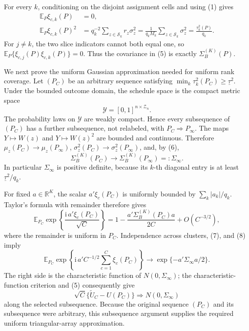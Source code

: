For every \(k\), conditioning on the disjoint assignment cells and using (1) gives
\[
\begin{aligned}
\mathbb E_P\xi_{c,k}(P)&=0,\\
\mathbb E_P\xi_{c,k}(P)^2
&=q_k^{-2}\sum_{z\in\mathcal S_k}r_z\sigma_z^2
=\frac1{q_kM_k}\sum_{z\in\mathcal S_k}\sigma_z^2
=\frac{\tau_k^2(P)}{q_k}. 
\end{aligned} \tag{6}
\]
For \(j\ne k\), the two slice indicators cannot both equal one, so
\(\mathbb E_P\{\xi_{c,j}(P)\xi_{c,k}(P)\}=0\).  Thus the covariance in (5) is exactly \(\Sigma_B^{(K)}(P)\).

We next prove the uniform Gaussian approximation needed for uniform rank coverage.  Let \((P_C)\) be an arbitrary sequence satisfying
\(\min_k\tau_k^2(P_C)\geq\underline\tau^2\).  Under the bounded outcome domain, the schedule space is the compact metric space
\[
\mathcal Y=[0,1]^{n\times\mathcal Z_n}.
\]
The probability laws on \(\mathcal Y\) are weakly compact.  Hence every subsequence of \((P_C)\) has a further subsequence, not relabeled, with \(P_C\Rightarrow P_\infty\).  The maps \(Y\mapsto W(z)\) and \(Y\mapsto W(z)^2\) are bounded and continuous.  Therefore \(\mu_z(P_C)\to\mu_z(P_\infty)\), \(\sigma_z^2(P_C)\to\sigma_z^2(P_\infty)\), and, by (6),
\[
\Sigma_B^{(K)}(P_C)\longrightarrow\Sigma_B^{(K)}(P_\infty)=:\Sigma_\infty. \tag{7}
\]
In particular \(\Sigma_\infty\) is positive definite, because its \(k\)-th diagonal entry is at least \(\underline\tau^2/q_k\).

For fixed \(a\in\mathbb R^K\), the scalar \(a'\xi_c(P_C)\) is uniformly bounded by
\(\sum_k|a_k|/q_k\).  Taylor's formula with remainder therefore gives
\[
\mathbb E_{P_C}\exp\!\left\{\frac{\mathrm i\,a'\xi_c(P_C)}{\sqrt C}\right\}
=1-\frac{a'\Sigma_B^{(K)}(P_C)a}{2C}+O(C^{-3/2}), \tag{8}
\]
where the remainder is uniform in \(P_C\).  Independence across clusters, (7), and (8) imply
\[
\mathbb E_{P_C}\exp\!\left\{\mathrm i\,a'C^{-1/2}\sum_{c=1}^C\xi_c(P_C)\right\}
\longrightarrow \exp\{-a'\Sigma_\infty a/2\}. \tag{9}
\]
The right side is the characteristic function of \(N(0,\Sigma_\infty)\); the characteristic-function criterion and (5) consequently give
\[
\sqrt C\{\widetilde U_C-U(P_C)\}\Rightarrow N(0,\Sigma_\infty) \tag{10}
\]
along the selected subsequence.  Because the original sequence \((P_C)\) and its subsequence were arbitrary, this subsequence argument supplies the required uniform triangular-array approximation.

